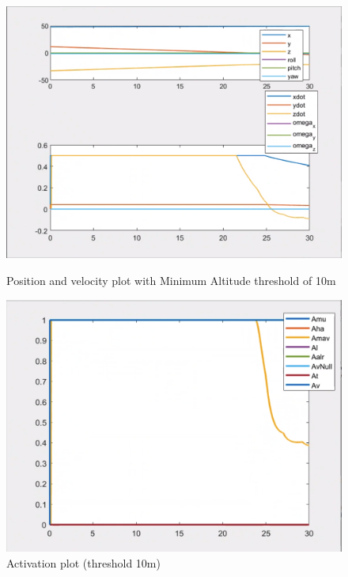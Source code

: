 \documentclass{article}
\begin{document}
\begin{figure}[htpb] 
\begin{minipage}{0.40\textwidth}  
\includegraphics[width=\textwidth]{123_10m_ppdot.png}
\caption{Position and velocity plot with Minimum Altitude threshold of 10m}\label{10m_ppdot} 
\end{minipage}  
\hspace{0.2\textwidth} 
\begin{minipage}{0.43\textwidth}  
\includegraphics[width=\textwidth]{123_10m_A.png}
\caption{Activation plot (threshold 10m) }\label{10m_A} 
\end{minipage} 
\end{figure}
\end{document}
